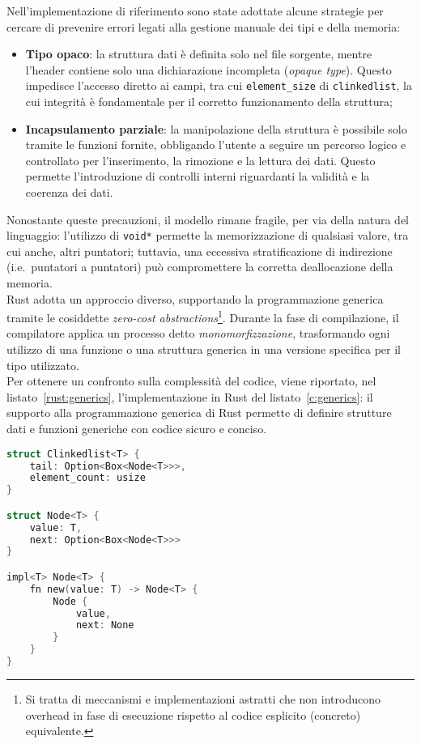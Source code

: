 Nell'implementazione di riferimento sono state adottate alcune strategie per cercare di prevenire errori legati alla gestione manuale dei tipi e della memoria:
\begin{itemize}
    \item \textbf{Tipo opaco}: la struttura dati è definita solo nel file sorgente, mentre l'header contiene solo una dichiarazione incompleta (\textit{opaque type}). Questo impedisce l'accesso diretto ai campi, tra cui \texttt{element\_size} di \texttt{clinkedlist}, la cui integrità è fondamentale per il corretto funzionamento della struttura;
    \item \textbf{Incapsulamento parziale}: la manipolazione della struttura è possibile solo tramite le funzioni fornite, obbligando l'utente a seguire un percorso logico e controllato per l'inserimento, la rimozione e la lettura dei dati. Questo permette l'introduzione di controlli interni riguardanti la validità e la coerenza dei dati. 
\end{itemize}
Nonostante queste precauzioni, il modello rimane fragile, per via della natura del linguaggio: l'utilizzo di \texttt{void*} permette la memorizzazione di qualsiasi valore, tra cui anche, altri puntatori; tuttavia, una eccessiva stratificazione di indirezione (i.e.\  puntatori a puntatori) può compromettere
la corretta deallocazione della memoria. \hfill
\vspace{15pt} \\
\noindent Rust adotta un approccio diverso, supportando la programmazione generica tramite le cosiddette \textit{zero-cost abstractions}\footnote{Si tratta di meccanismi e implementazioni astratti che non introducono overhead in fase di esecuzione rispetto al codice esplicito (concreto) equivalente.}.
Durante la fase di compilazione, il compilatore applica un processo detto \textit{monomorfizzazione}, trasformando ogni utilizzo di una funzione o una struttura
generica in una versione specifica per il tipo utilizzato.\hfill 
\vspace{8pt}\\
\noindent Per ottenere un confronto sulla complessità del codice, viene riportato, nel listato~\ref{rust:generics}, l'implementazione in Rust del listato~\ref{c:generics}: 
il supporto alla programmazione generica di Rust permette di definire strutture dati e funzioni generiche con codice sicuro e conciso.
\begin{lstlisting}[language=C, float, caption={Programmazione generica in Rust}, label={rust:generics}]
struct Clinkedlist<T> {
	tail: Option<Box<Node<T>>>,
	element_count: usize
}

struct Node<T> {
    value: T,
    next: Option<Box<Node<T>>>
}

impl<T> Node<T> {
    fn new(value: T) -> Node<T> {
        Node {
            value,
            next: None
        }
    }
}
\end{lstlisting}

